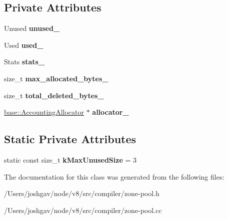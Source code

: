 \subsection*{Private Attributes}
\begin{DoxyCompactItemize}
\item 
Unused {\bfseries unused\+\_\+}\hypertarget{classv8_1_1internal_1_1compiler_1_1_zone_pool_ac6fd3320a80c82c4873cd9d0624e78a6}{}\label{classv8_1_1internal_1_1compiler_1_1_zone_pool_ac6fd3320a80c82c4873cd9d0624e78a6}

\item 
Used {\bfseries used\+\_\+}\hypertarget{classv8_1_1internal_1_1compiler_1_1_zone_pool_a6a0842db16a3a8b71d24676f8694a5c3}{}\label{classv8_1_1internal_1_1compiler_1_1_zone_pool_a6a0842db16a3a8b71d24676f8694a5c3}

\item 
Stats {\bfseries stats\+\_\+}\hypertarget{classv8_1_1internal_1_1compiler_1_1_zone_pool_adf8b202e6246461abb859fc07c51e439}{}\label{classv8_1_1internal_1_1compiler_1_1_zone_pool_adf8b202e6246461abb859fc07c51e439}

\item 
size\+\_\+t {\bfseries max\+\_\+allocated\+\_\+bytes\+\_\+}\hypertarget{classv8_1_1internal_1_1compiler_1_1_zone_pool_a888503098f0115fa8f892c756a97d160}{}\label{classv8_1_1internal_1_1compiler_1_1_zone_pool_a888503098f0115fa8f892c756a97d160}

\item 
size\+\_\+t {\bfseries total\+\_\+deleted\+\_\+bytes\+\_\+}\hypertarget{classv8_1_1internal_1_1compiler_1_1_zone_pool_ac4b9f5752966cba57892e33780f3ceaa}{}\label{classv8_1_1internal_1_1compiler_1_1_zone_pool_ac4b9f5752966cba57892e33780f3ceaa}

\item 
\hyperlink{classv8_1_1base_1_1_accounting_allocator}{base\+::\+Accounting\+Allocator} $\ast$ {\bfseries allocator\+\_\+}\hypertarget{classv8_1_1internal_1_1compiler_1_1_zone_pool_a24036d9b887a94346f30cebf5763e387}{}\label{classv8_1_1internal_1_1compiler_1_1_zone_pool_a24036d9b887a94346f30cebf5763e387}

\end{DoxyCompactItemize}
\subsection*{Static Private Attributes}
\begin{DoxyCompactItemize}
\item 
static const size\+\_\+t {\bfseries k\+Max\+Unused\+Size} = 3\hypertarget{classv8_1_1internal_1_1compiler_1_1_zone_pool_a292988e483500f39c12272d497f6cea0}{}\label{classv8_1_1internal_1_1compiler_1_1_zone_pool_a292988e483500f39c12272d497f6cea0}

\end{DoxyCompactItemize}


The documentation for this class was generated from the following files\+:\begin{DoxyCompactItemize}
\item 
/\+Users/joshgav/node/v8/src/compiler/zone-\/pool.\+h\item 
/\+Users/joshgav/node/v8/src/compiler/zone-\/pool.\+cc\end{DoxyCompactItemize}
